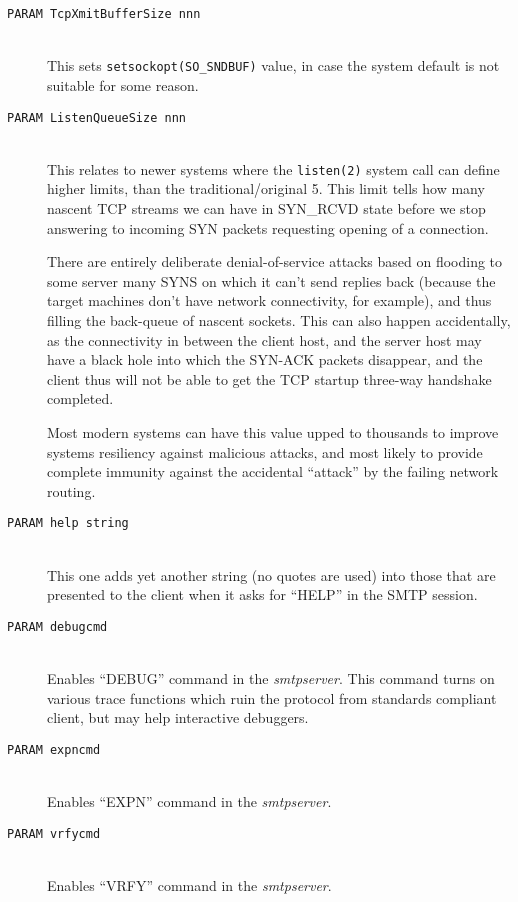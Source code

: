 \begin{description}
\item[\tt PARAM TcpXmitBufferSize nnn] \mbox{} \\
This sets {\tt setsockopt(SO\_SNDBUF)} value, 
in case the system default is not suitable for some reason.

\item[\tt PARAM ListenQueueSize nnn] \mbox{} \\
This relates to newer systems where the {\tt listen(2)} system call
can define higher limits, than the traditional/original 5.
This limit tells how many nascent TCP streams we can have in
SYN\_RCVD state before we stop answering to incoming SYN packets
requesting opening of a connection.

There are entirely deliberate denial-of-service attacks based on
flooding to some server many SYNS on which it can't send replies
back (because the target machines don't have network connectivity,
for example), and thus filling the back-queue of nascent sockets.
This can also happen accidentally, as the connectivity in between
the client host, and the server host may have a black hole into
which the SYN-ACK packets disappear, and the client thus will not
be able to get the TCP startup three-way handshake completed.

Most modern systems can have this value upped to thousands to
improve systems resiliency against malicious attacks, and most
likely to provide complete immunity against the accidental
``attack'' by the failing network routing.


\item[\tt PARAM help string] \mbox{} \\
This one adds yet another string (no quotes are used) into those
that are presented to the client when it asks for ``HELP'' in the
SMTP session.

\item[\tt PARAM debugcmd] \mbox{} \\
Enables ``DEBUG'' command in the {\em smtpserver}.
This command turns on various trace functions which ruin the protocol
from standards compliant client, but may help interactive debuggers.

\item[\tt PARAM expncmd] \mbox{} \\
Enables ``EXPN'' command in the {\em smtpserver}.

\item[\tt PARAM vrfycmd] \mbox{} \\
Enables ``VRFY'' command in the {\em smtpserver}.



\end{description}
